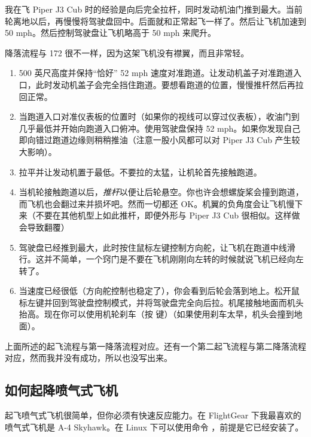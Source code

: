 我在飞 Piper J3 Cub 时的经验是向后完全拉杆，同时发动机油门推到最大。当前轮离地以后，再慢慢将驾驶盘回中。后面就和正常起飞一样了。然后让飞机加速到 50 mph。然后控制驾驶盘让飞机略高于 50 mph 来爬升。

降落流程与 172 很不一样，因为这架飞机没有襟翼，而且非常轻。

\begin{enumerate}
    \item 500 英尺高度并保持“恰好” 52 mph 速度对准跑道。让发动机盖子对准跑道入口，此时发动机盖子会完全挡住跑道。要想看跑道的位置，慢慢推杆然后再拉回正常。
    \item 当跑道入口对准仪表板的位置时（如果你的视线可以穿过仪表板），收油门到几乎最低并开始向跑道入口俯冲。使用驾驶盘保持 52 mph。如果你发现自己即向错过跑道边缘则稍稍推油（注意一股小风都可以对 Piper J3 Cub 产生较大影响）。
    \item 拉平并让发动机置于最低。不要拉的太猛，让机轮首先接触跑道。
    \item 当机轮接触跑道以后，\emph{推杆}以便让后轮悬空。你也许会想螺旋桨会撞到跑道，而飞机也会翻过来并损坏吧。然而一切都还 OK。机翼的负角度会让飞机慢下来（不要在其他机型上如此推杆，即便外形与 Piper J3 Cub 很相似。这样做会导致翻覆）
    \item 驾驶盘已经推到最大，此时按住鼠标左键控制方向舵，让飞机在跑道中线滑行。这并不简单，一个窍门是不要在飞机刚刚向左转的时候就说飞机已经向左转了。
    \item 当速度已经很低（方向舵控制也稳定了），你会看到后轮会落到地上。松开鼠标左键并回到驾驶盘控制模式，并将驾驶盘完全向后拉。机尾接触地面而机头抬高。现在你可以使用机轮刹车（按  键）（如果使用刹车太早，机头会撞到地面）。
\end{enumerate}

上面所述的起飞流程与第一降落流程对应。还有一个第二起飞流程与第二降落流程对应，然而我并没有成功，所以也没写出来。

 \subsection{如何起降喷气式飞机}
    \label{sec:Jet}

起飞喷气式飞机很简单，但你必须有快速反应能力。在 FlightGear 下我最喜欢的喷气式飞机是 A-4 Skyhawk。在 Linux 下可以使用命令 ，前提是它已经安装了。

